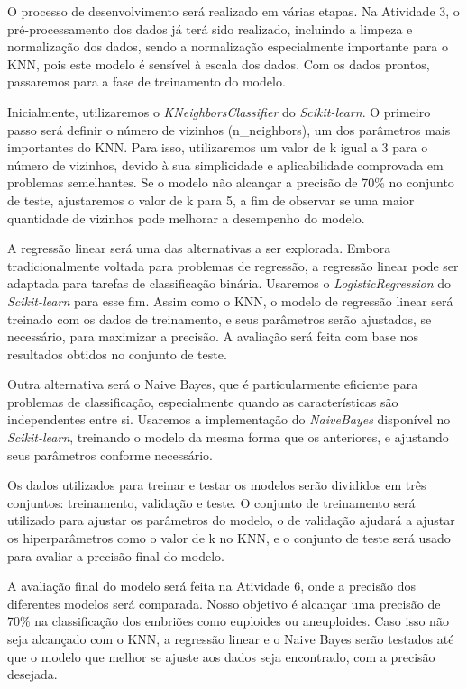 O processo de desenvolvimento será realizado em várias etapas. Na Atividade 3, o pré-processamento dos dados já terá sido realizado, incluindo a limpeza e normalização dos dados, sendo a normalização especialmente importante para o KNN, pois este modelo é sensível à escala dos dados. Com os dados prontos, passaremos para a fase de treinamento do modelo.

Inicialmente, utilizaremos o \textit{KNeighborsClassifier} do \textit{Scikit-learn}. O primeiro passo será definir o número de vizinhos (n\_neighbors), um dos parâmetros mais importantes do KNN. Para isso,  utilizaremos um valor de 
k igual a 3 para o número de vizinhos, devido à sua simplicidade e aplicabilidade comprovada em problemas semelhantes. Se o modelo não alcançar a precisão de 70\% no conjunto de teste, ajustaremos o valor de k para 5, a fim de observar se uma maior quantidade de vizinhos pode melhorar a desempenho do modelo.

A regressão linear será uma das alternativas a ser explorada. Embora tradicionalmente voltada para problemas de regressão, a regressão linear pode ser adaptada para tarefas de classificação binária. Usaremos o \textit{LogisticRegression} do \textit{Scikit-learn} para esse fim. Assim como o KNN, o modelo de regressão linear será treinado com os dados de treinamento, e seus parâmetros serão ajustados, se necessário, para maximizar a precisão. A avaliação será feita com base nos resultados obtidos no conjunto de teste.

Outra alternativa será o Naive Bayes, que é particularmente eficiente para problemas de classificação, especialmente quando as características são independentes entre si. Usaremos a implementação do \textit{NaiveBayes} disponível no \textit{Scikit-learn}, treinando o modelo da mesma forma que os anteriores, e ajustando seus parâmetros conforme necessário.

Os dados utilizados para treinar e testar os modelos serão divididos em três conjuntos: treinamento, validação e teste. O conjunto de treinamento será utilizado para ajustar os parâmetros do modelo, o de validação ajudará a ajustar os hiperparâmetros como o valor de k no KNN, e o conjunto de teste será usado para avaliar a precisão final do modelo.

A avaliação final do modelo será feita na Atividade 6, onde a precisão dos diferentes modelos será comparada. Nosso objetivo é alcançar uma precisão de 70\% na classificação dos embriões como euploides ou aneuploides. Caso isso não seja alcançado com o KNN, a regressão linear e o Naive Bayes serão testados até que o modelo que melhor se ajuste aos dados seja encontrado, com a precisão desejada.


